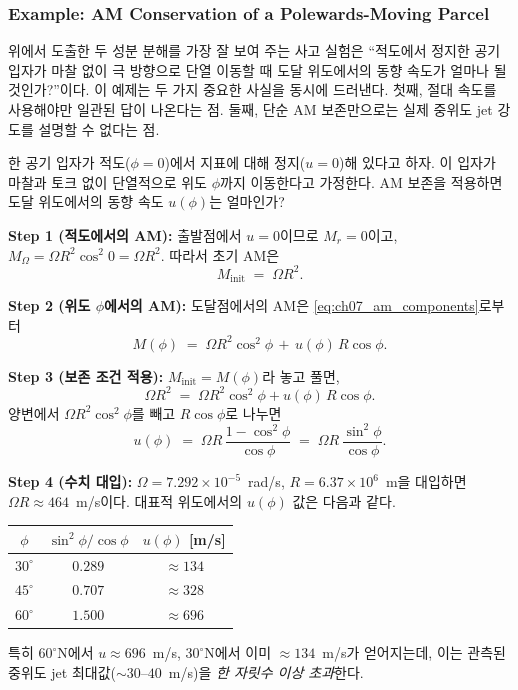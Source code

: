 \subsubsection{Example: AM Conservation of a Polewards-Moving Parcel}

위에서 도출한 두 성분 분해를 가장 잘 보여 주는 사고 실험은 ``적도에서 정지한
공기 입자가 마찰 없이 극 방향으로 단열 이동할 때 도달 위도에서의 동향 속도가
얼마나 될 것인가?''이다.  이 예제는 두 가지 중요한 사실을 동시에 드러낸다.
첫째, 절대 속도를 사용해야만 일관된 답이 나온다는 점.  둘째, 단순 AM 보존만으로는
실제 중위도 jet 강도를 설명할 수 없다는 점.

\begin{example}\label{ex:ch07_am_polewards}
한 공기 입자가 적도($\phi=0$)에서 지표에 대해 정지($u=0$)해 있다고 하자.  이 입자가
마찰과 토크 없이 단열적으로 위도 $\phi$까지 이동한다고 가정한다.  AM 보존을
적용하면 도달 위도에서의 동향 속도 $u(\phi)$는 얼마인가?

\textbf{Step 1 (적도에서의 AM):}
출발점에서 $u=0$이므로 $M_r = 0$이고, $M_\Omega = \Omega R^2 \cos^2 0 = \Omega R^2$.
따라서 초기 AM은
\begin{equation}\label{eq:ch07_am_ex_init}
  M_{\text{init}} \;=\; \Omega R^2.
\end{equation}

\textbf{Step 2 (위도 $\phi$에서의 AM):}
도달점에서의 AM은 \eqref{eq:ch07_am_components}로부터
\begin{equation}\label{eq:ch07_am_ex_final}
  M(\phi) \;=\; \Omega R^2 \cos^2\phi \,+\, u(\phi)\,R\cos\phi.
\end{equation}

\textbf{Step 3 (보존 조건 적용):}
$M_{\text{init}} = M(\phi)$라 놓고 풀면,
\[
  \Omega R^2 \;=\; \Omega R^2 \cos^2\phi + u(\phi)\,R\cos\phi.
\]
양변에서 $\Omega R^2 \cos^2\phi$를 빼고 $R\cos\phi$로 나누면
\begin{equation}\label{eq:ch07_am_ex_uphi}
  \boxed{\;u(\phi) \;=\; \Omega R\,\frac{1-\cos^2\phi}{\cos\phi}
                       \;=\; \Omega R\,\frac{\sin^2\phi}{\cos\phi}.\;}
\end{equation}

\textbf{Step 4 (수치 대입):}
$\Omega = 7.292\times 10^{-5}$~rad/s, $R = 6.37\times 10^6$~m을 대입하면 $\Omega R
\approx 464$~m/s이다.  대표적 위도에서의 $u(\phi)$ 값은 다음과 같다.
\begin{center}
\begin{tabular}{c|c|c}
$\phi$ & $\sin^2\phi/\cos\phi$ & $u(\phi)$ [m/s] \\\hline
$30^\circ$ & $0.289$ & $\approx 134$ \\
$45^\circ$ & $0.707$ & $\approx 328$ \\
$60^\circ$ & $1.500$ & $\approx 696$ \\
\end{tabular}
\end{center}
특히 $60^\circ$N에서 $u \approx 696$~m/s, $30^\circ$N에서 이미 $\approx 134$~m/s가
얻어지는데, 이는 관측된 중위도 jet 최대값($\sim 30$--$40$~m/s)을 \emph{한 자릿수
이상 초과}한다.


\end{example}
